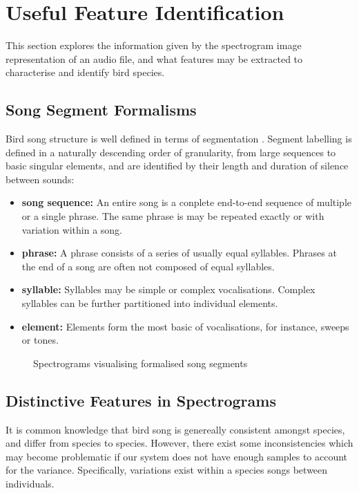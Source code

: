 \section{Useful Feature Identification}
This section explores the information given by the spectrogram image
representation of an audio file, and what features may be extracted to
characterise and identify bird species.

\subsection{Song Segment Formalisms}
Bird song structure is well defined in terms of segmentation \parencite{Catch1997}.
Segment labelling is defined in a naturally descending order of granularity, from
large sequences to basic singular elements, and are identified by their length
and duration of silence between sounds:
\begin{itemize}
  \item \textbf{song sequence:}
    An entire song is a conplete end-to-end sequence of multiple or a single
    phrase.
    The same phrase is may be repeated exactly or with variation within a
    song.
  \item \textbf{phrase:}
    A phrase consists of a series of usually equal syllables.
    Phrases at the end of a song are often not composed of equal syllables.
  \item \textbf{syllable:}
    Syllables may be simple or complex vocalisations.
    Complex syllables can be further partitioned into individual elements.
  \item \textbf{element:}
    Elements form the most basic of vocalisations, for instance, sweeps or tones.
\end{itemize}

\begin{figure}[!htb]
  \centering
  \begin{subfigure}[t]{0.5\textwidth}
    \centering
    \caption{}
  \end{subfigure}
  \begin{subfigure}[t]{0.5\textwidth}
    \centering
    \caption{}
  \end{subfigure}
  \caption{Spectrograms visualising formalised song segments}
\end{figure}

\subsection{Distinctive Features in Spectrograms}
It is common knowledge that bird song is genereally consistent amongst species,
and differ from species to species.
However, there exist some inconsistencies which may become problematic if our
system does not have enough samples to account for the variance.
Specifically, variations exist within a species songs between individuals.

